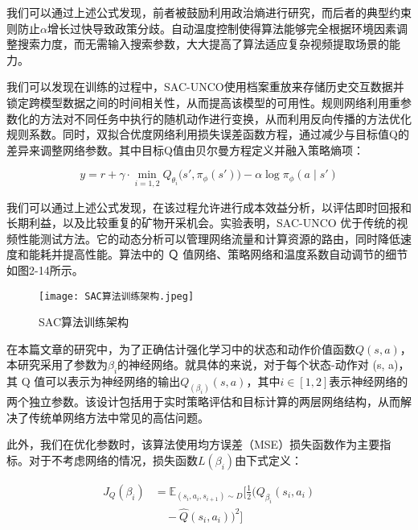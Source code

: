 我们可以通过上述公式发现，前者被鼓励利用政治熵进行研究，而后者的典型约束则防止$α$增长过快导致政策分歧。自动温度控制使得算法能够完全根据环境因素调整搜索力度，而无需输入搜索参数，大大提高了算法适应复杂视频提取场景的能力。

我们可以发现在训练的过程中，SAC-UNCO使用档案重放来存储历史交互数据并锁定跨模型数据之间的时间相关性，从而提高该模型的可用性。规则网络利用重参数化的方法对不同任务中执行的随机动作进行变换，从而利用反向传播的方法优化规则系数。同时，双拟合优度网络利用损失误差函数方程，通过减少与目标值Q的差异来调整网络参数。其中目标Q值由贝尔曼方程定义并融入策略熵项：

\begin{equation}
	y = r + \gamma \cdot \min_{i=1,2} Q_{\theta_i}\big(s', \pi_\phi(s')\big) - \alpha \log \pi_\phi(a \mid s')
\end{equation}

我们可以通过上述公式发现，在该过程允许进行成本效益分析，以评估即时回报和长期利益，以及比较重复的矿物开采机会。实验表明，SAC-UNCO 优于传统的视频性能测试方法。它的动态分析可以管理网络流量和计算资源的路由，同时降低速度和能耗并提高性能。算法中的 Ｑ 值网络、策略网络和温度系数自动调节的细节如图2-14所示。

\begin{figure}[hbt]
	\centering
	\texttt{[image: SAC算法训练架构.jpeg]}
	\caption{SAC算法训练架构}
	\label{f.example}
\end{figure}



在本篇文章的研究中，为了正确估计强化学习中的状态和动作价值函数$Q(s,a)$，本研究采用了参数为$β_i$的神经网络。就具体的来说，对于每个状态-动作对 (s, a)，其 Q 值可以表示为神经网络的输出$Q_(β_i)(s, a)$，其中$i∈[1,2]$表示神经网络的两个独立参数。该设计包括用于实时策略评估和目标计算的两层网络结构，从而解决了传统单网络方法中常见的高估问题。

此外，我们在优化参数时，该算法使用均方误差（MSE）损失函数作为主要指标。对于不考虑网络的情况，损失函数$L(β_i)$由下式定义：

\begin{equation}
	\begin{split}
		J_{Q}(\beta_{i}) 
		&= \mathbb{E}_{(s_i, a_i, s_{i+1}) \sim D} \bigg[ \frac{1}{2} \Big( Q_{\beta_i}(s_i, a_i) \\
		&\quad - \hat{Q}(s_i, a_i) \Big)^2 \bigg]
	\end{split}
\end{equation}

